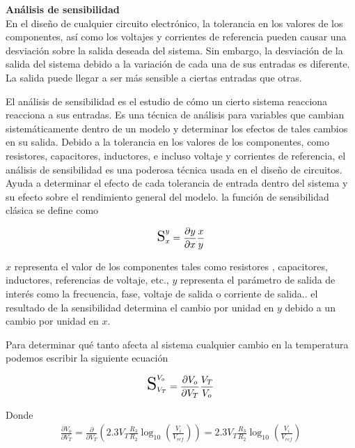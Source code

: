\documentclass[12pt,a4paper]{article}
\begin{document}
	\noindent \textbf{Análisis de sensibilidad}\\
	En el diseño de cualquier circuito electrónico, la tolerancia en los valores de los componentes, así como los voltajes y corrientes de referencia pueden causar una desviación sobre la salida deseada del sistema. Sin embargo, la desviación de la salida del sistema debido a la variación de cada una de sus entradas es diferente. La salida puede llegar a ser más sensible a ciertas entradas que otras.
	
	El análisis de sensibilidad es el estudio de cómo un cierto sistema reacciona reacciona a sus entradas. Es una técnica de análisis para variables que cambian sistemáticamente dentro de un modelo y determinar los efectos de tales cambios en su salida.
	Debido a la tolerancia en los valores de los componentes, como resistores, capacitores, inductores, e incluso voltaje y corrientes de referencia, el análisis de sensibilidad es una poderosa técnica usada en el diseño de circuitos. Ayuda a determinar el efecto de cada tolerancia de entrada dentro del sistema y su efecto sobre el rendimiento general del modelo. la función de sensibilidad clásica se define como 
	
	\begin{tcolorbox}[colback=red!5!white,colframe=red!75!black,width=(\linewidth+0.45cm)]
		\begin{equation}
			\scalebox{1.5}{S}_x^{y} = \frac{\partial y}{\partial x} \frac{x}{y}
		\end{equation}
	\end{tcolorbox}

	$x$ representa el valor de los componentes tales como resistores , capacitores, inductores, referencias de voltaje, etc., $y$ representa el parámetro de salida de interés como la frecuencia, fase, voltaje de salida o corriente de salida.. el resultado de la sensibilidad determina el cambio por unidad en $y$ debido a un cambio por unidad en $x$.
	
	Para determinar qué tanto afecta al sistema cualquier cambio en la temperatura podemos escribir la siguiente ecuación
	
	\begin{align}
		\scalebox{1.8}{S}_{V_T}^{V_o} = \frac{\partial V_o}{\partial V_T} \frac{V_T}{V_o}
	\end{align}

	Donde
	\begin{align}
		\frac{\partial V_o}{\partial V_T} = \frac{\partial}{\partial V_T}\left( 2.3V_T \frac{R_3}{R_2} \log_{10} \left(\frac{V_i}{V_{ref}}\right) \right) = 2.3V_T \frac{R_3}{R_2}\log_{10}\left( \frac{V_i}{V_{ref}} \right)
	\end{align}
\end{document}
